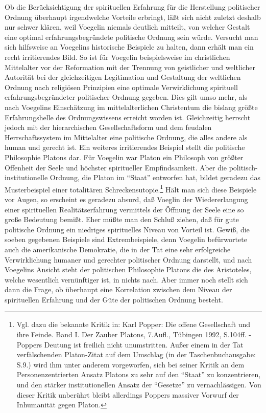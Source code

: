 Ob die Berücksichtigung der spirituellen Erfahrung für die Herstellung
politischer Ordnung überhaupt irgendwelche Vorteile erbringt, läßt sich nicht
zuletzt deshalb nur schwer klären, weil Voegelin niemals deutlich mitteilt,
von welcher Gestalt eine optimal erfahrungsbegründete politische Ordnung sein
würde. Versucht man sich hilfsweise an Voegelins historische Beispiele zu
halten, dann erhält man ein recht irritierendes Bild.  So ist für Voegelin
beispielsweise im christlichen Mittelalter vor der Reformation mit der
Trennung von geistlicher und weltlicher Autorität bei der gleichzeitigen
Legitimation und Gestaltung der weltlichen Ordnung nach religiösen Prinzipien
eine optimale Verwirklichung spirituell erfahrungsbegründeter politischer
Ordnung gegeben. Dies gilt umso mehr, als nach Voegelins Einschätzung im
mittelalterlichen Christentum die bislang größte Erfahrungshelle des
Ordnungswissens erreicht worden ist. Gleichzeitig herrscht jedoch mit der
hierarchischen Gesellschaftsform und dem feudalen Herrschaftssystem im
Mittelalter eine politische Ordnung, die alles andere als human und gerecht
ist. Ein weiteres irritierendes Beispiel stellt die politische Philosophie
Platons dar. Für Voegelin war Platon ein Philosoph von größter Offenheit der
Seele und höchster spiritueller Empfindsamkeit. Aber die
politisch-institutionelle Ordnung, die Platon im "`Staat"' entworfen hat,
bildet geradezu das Musterbeispiel einer totalitären
Schreckensutopie.\footnote{Vgl. dazu die bekannte Kritik in: Karl Popper: Die
  offene Gesellschaft und ihre Feinde. Band I. Der Zauber Platons, 7.Aufl.,
  Tübingen 1992, S.104ff. - Poppers Deutung ist freilich nicht unumstritten.
  Außer einem in der Tat verfälschenden Platon-Zitat auf dem Umschlag (in der
  Taschenbuchausgabe: S.9.) wird ihm unter anderem vorgeworfen, sich bei
  seiner Kritik an dem Personenzentrierten Ansatz Platons zu sehr auf den
  "`Staat"' zu konzentrieren, und den stärker institutionellen Ansatz der
  "`Gesetze"' zu vernachlässigen. Von dieser Kritik unberührt bleibt
  allerdings Poppers massiver Vorwurf der Inhumanität gegen Platon.}
Hält man sich diese Beispiele vor Augen, so erscheint es geradezu absurd, daß
Voeglin der Wiedererlangung einer spirituellen Realitätserfahrung vermittels
der Öffnung der Seele eine so große Bedeutung bemißt. Eher müßte man den
Schluß ziehen, daß für gute politische Ordnung ein niedriges spirituelles
Niveau von Vorteil ist. Gewiß, die soeben gegebenen Beispiele sind
Extrembeispiele, denn Voegelin befürwortete auch die amerikanische Demokratie,
die in der Tat eine sehr erfolgreiche Verwirklichung humaner und gerechter
politischer Ordnung darstellt, und nach Voegelins Ansicht steht der
politischen Philosophie Platons die des Aristoteles, welche wesentlich
vernünftiger ist, in nichts nach. Aber immer noch stellt sich dann die Frage,
ob überhaupt eine Korrelation zwischen dem Niveau der spirituellen Erfahrung
und der Güte der politischen Ordnung besteht.

